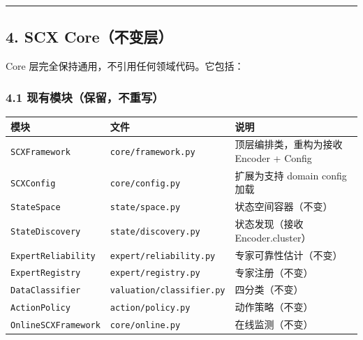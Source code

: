 \documentclass[
  12pt,
]{ctexart}
\begin{document}
\begin{center}\rule{0.5\linewidth}{0.5pt}\end{center}

\subsection{4. SCX Core（不变层）}\label{scx-coreux4e0dux53d8ux5c42}

Core 层完全保持通用，不引用任何领域代码。它包括：

\subsubsection{4.1
现有模块（保留，不重写）}\label{ux73b0ux6709ux6a21ux5757ux4fddux7559ux4e0dux91cdux5199}

\begin{longtable}[]{@{}
  >{\raggedright\arraybackslash}p{}
  >{\raggedright\arraybackslash}p{}
  >{\raggedright\arraybackslash}p{}@{}}
\toprule\noalign{}
\begin{minipage}[b]{\linewidth}\raggedright
模块
\end{minipage} & \begin{minipage}[b]{\linewidth}\raggedright
文件
\end{minipage} & \begin{minipage}[b]{\linewidth}\raggedright
说明
\end{minipage} \\
\midrule\noalign{}
\endhead
\bottomrule\noalign{}
\endlastfoot
\texttt{SCXFramework} & \texttt{core/framework.py} &
顶层编排类，重构为接收 Encoder + Config \\
\texttt{SCXConfig} & \texttt{core/config.py} & 扩展为支持 domain config
加载 \\
\texttt{StateSpace} & \texttt{state/space.py} & 状态空间容器（不变） \\
\texttt{StateDiscovery} & \texttt{state/discovery.py} & 状态发现（接收
Encoder.cluster） \\
\texttt{ExpertReliability} & \texttt{expert/reliability.py} &
专家可靠性估计（不变） \\
\texttt{ExpertRegistry} & \texttt{expert/registry.py} &
专家注册（不变） \\
\texttt{DataClassifier} & \texttt{valuation/classifier.py} &
四分类（不变） \\
\texttt{ActionPolicy} & \texttt{action/policy.py} & 动作策略（不变） \\
\texttt{OnlineSCXFramework} & \texttt{core/online.py} &
在线监测（不变） \\
\end{longtable}
\end{document}

